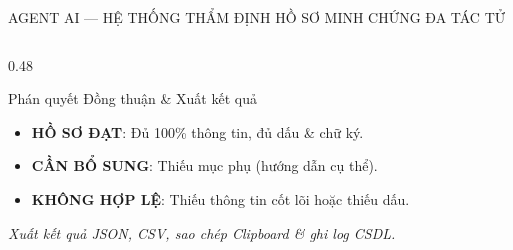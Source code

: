\documentclass[aspectratio=169, 10pt]{beamer}
\begin{document}
\begin{frame}{AGENT AI — HỆ THỐNG THẨM ĐỊNH HỒ SƠ MINH CHỨNG ĐA TÁC TỬ}
\begin{columns}[T]
\begin{column}{0.48\textwidth}
      \begin{highlightCard}{Phán quyết Đồng thuận \& Xuất kết quả}
        \fontsize{6.8pt}{8.5pt}\selectfont
        \begin{itemize}
          \setlength{\itemsep}{1.2pt}
          \item \textbf{\color{SuccessGreen}HỒ SƠ ĐẠT}: Đủ 100\% thông tin, đủ dấu \& chữ ký.
          \item \textbf{\color{GoldYellow}CẦN BỔ SUNG}: Thiếu mục phụ (hướng dẫn cụ thể).
          \item \textbf{\color{PartyRed}KHÔNG HỢP LỆ}: Thiếu thông tin cốt lõi hoặc thiếu dấu.
        \end{itemize}
        \textit{Xuất kết quả JSON, CSV, sao chép Clipboard \& ghi log CSDL.}
      \end{highlightCard}
    \end{column}
  \end{columns}
\end{frame}
\end{document}
